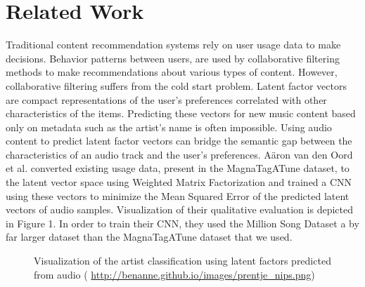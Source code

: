 \documentclass[11pt, a4paper]{article}
\begin{document}
  \section{Related Work}
    Traditional content recommendation systems rely on user usage data to make
    decisions. Behavior patterns between users, are used by collaborative
    filtering methods to make recommendations about various types of content.
    However, collaborative filtering suffers from the cold start problem.
    Latent factor vectors are compact representations of the user's preferences
    correlated with other characteristics of the items. Predicting these
    vectors for new music content based only on metadata such as the artist's
    name is often impossible. Using audio content to predict latent factor
    vectors can bridge the semantic gap between the characteristics of an audio
    track and the user's preferences. A\"{a}ron van den Oord et al.
    \cite{deep-content-based-music-recommendation} converted existing usage
    data, present in the MagnaTagATune dataset, to the latent vector space
    using Weighted Matrix Factorization and trained a CNN using these vectors
    to minimize the Mean Squared Error of the predicted latent vectors of audio
    samples. Visualization of their qualitative evaluation is depicted in
    Figure 1. In order to train their CNN, they used the Million Song Dataset
    a by far larger dataset than the MagnaTagATune dataset that we used.

    \begin{figure}
      \centering
      \caption{Visualization of the artist classification using latent factors
        predicted from audio (
        \url{http://benanne.github.io/images/prentje\_nips.png})}
    \end{figure}
\end{document}
